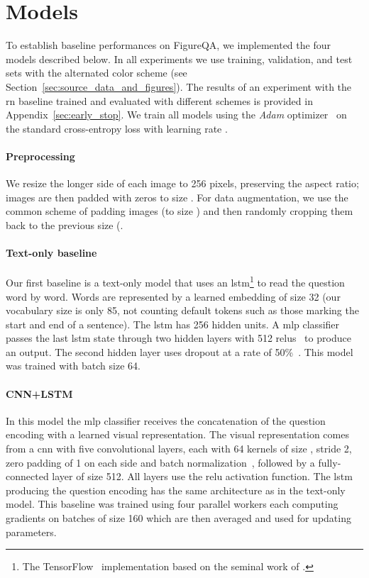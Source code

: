 \documentclass{article} \usepackage{iclr2018_workshop,times}
\begin{document}
\section{Models}
\label{sec:models}
To establish baseline performances on FigureQA, we implemented the four models described below. In all experiments we use training, validation, and test sets with the alternated color scheme (see Section~\ref{sec:source_data_and_figures}).
The results of an experiment with the \gls{rn} baseline trained and evaluated with different schemes is provided in Appendix~\ref{sec:early_stop}.
We train all models using the \emph{Adam} optimizer~\citep{kingma2014adam} on the standard cross-entropy loss with learning rate .

\paragraph{Preprocessing} We resize the longer side of each image to 256 pixels, preserving the aspect ratio; images are then padded with zeros to size . For data augmentation, we use the common scheme of padding images (to size ) and then randomly cropping them back to the previous size (.

\paragraph{Text-only baseline}
Our first baseline is a text-only model that uses an \gls{lstm}\footnote{The TensorFlow~\citep{abadi2016tensorflow} implementation based on the seminal work of \citet{hochreiter1997long}.} to read the question word by word. Words are represented by a learned embedding of size 32 (our vocabulary size is only 85, not counting default tokens such as those marking the start and end of a sentence). The \gls{lstm} has 256 hidden units. 
A \gls{mlp} classifier passes the last \gls{lstm} state through two hidden layers with 512 \glspl{relu}~\citep{nair2010rectified} to produce an output. The second hidden layer uses dropout at a rate of 50\%~\citep{srivastava2014dropout}. This model was trained with batch size 64.

\paragraph{CNN+LSTM}
In this model the \gls{mlp} classifier receives the concatenation of the question encoding with a learned visual representation.
The visual representation comes from a \gls{cnn} with five convolutional layers, each with 64 kernels of size , stride 2, zero padding of 1 on each side and batch normalization~\citep{ioffe2015batch}, followed by a fully-connected layer of size 512. All layers use the \gls{relu} activation function.
The \gls{lstm} producing the question encoding has the same architecture as in the text-only model. This baseline was trained using four parallel workers each computing gradients on batches of size 160 which are then averaged and used for updating parameters.
\end{document}
